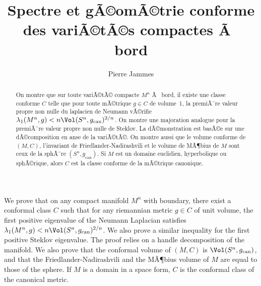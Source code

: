 \documentclass[11pt,a4paper]{smfart}
\title{Spectre et gÃ©omÃ©trie conforme 
des variÃ©tÃ©s compactes Ã  bord}
\author{Pierre Jammes}
\date{}
\begin{document}
\begin{abstract}
On montre que sur toute variÃ©tÃ© compacte $M^n$ Ã  bord, il
existe une classe conforme $C$ telle que pour toute mÃ©trique $g\in C$
de volume~1, la premiÃ¨re valeur propre non nulle du laplacien de Neumann 
vÃ©rifie $\lambda_1(M^n,g)< n\Vol(S^n,g_{\textrm{can}})^{2/n}$. On montre
une majoration analogue pour la premiÃ¨re valeur propre non nulle 
de Steklov. La dÃ©monstration est basÃ©e sur une 
dÃ©composition en anse de la variÃ©tÃ©. On montre aussi que le volume conforme
de $(M,C)$, l'invariant de Friedlander-Nadirashvili et le volume
de MÃ¶bius de $M$ sont ceux de la sphÃ¨re $(S^n,g_{\textrm{can}})$.
Si $M$ est un domaine euclidien, hyperbolique ou sphÃ©rique, alors $C$ 
est la classe conforme de la mÃ©trique canonique. 
\end{abstract}
\begin{altabstract}
We prove that on any compact manifold $M^n$ with boundary, there exist a 
conformal class $C$ such that for any riemannian metric $g\in C$ of
unit volume, the first positive eigenvalue of the Neumann Laplacian satisfies 
$\lambda_1(M^n,g)< n\Vol(S^n,g_{\textrm{can}})^{2/n}$. We also prove a 
similar inequality for the first positive Steklov eigenvalue.
 The proof 
relies on a handle decomposition of the manifold. We also 
prove that the conformal
volume of $(M,C)$ is $\Vol(S^n,g_{\textrm{can}})$, and that the 
Friedlander-Nadirashvili and the MÃ¶bius volume of $M$ are equal
to those of the sphere.  If $M$ is a domain in a space form, $C$ is 
the conformal class of the canonical metric.
\end{altabstract}


\maketitle
\end{document}
